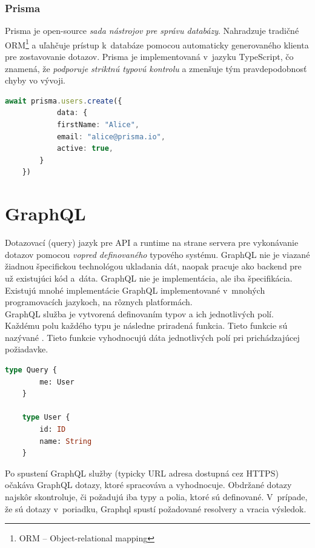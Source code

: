 \subsubsection{Prisma}
Prisma je open-source \emph{sada nástrojov pre správu databázy}. Nahradzuje tradičné ORM\footnote{ORM -- Object-relational mapping} a uľahčuje prístup k~databáze pomocou automaticky generovaného klienta pre zostavovanie dotazov. Prisma je implementovaná v~jazyku TypeScript, čo znamená, že \emph{podporuje striktnú typovú kontrolu} a zmenšuje tým pravdepodobnosť chyby vo vývoji. \cite{Prisma} \\

\begin{lstlisting}[language=TypeScript, caption=Príklad tvorby užívateľa pomocou nástroja Prisma. \cite{Prisma}]
	await prisma.users.create({
			data: {
			firstName: "Alice",
			email: "alice@prisma.io",
			active: true,
		}
	})
\end{lstlisting}

\section{GraphQL}
\label{section:graphql}
Dotazovací (query) jazyk pre API a runtime na strane servera pre vykonávanie dotazov pomocou \emph{vopred definovaného} typového systému. GraphQL nie je viazané žiadnou špecifickou technológou ukladania dát, naopak pracuje ako backend pre už existujúci kód a~dáta. \cite{GraphQL} GraphQL nie je implementácia, ale iba špecifikácia. Existujú mnohé implementácie GraphQL implementované v~mnohých programovacích jazykoch, na rôznych platformách. \\

\noindent GraphQL služba je vytvorená definovaním typov a ich jednotlivých polí. Každému polu každého typu je následne priradená funkcia. \cite{GraphQL} Tieto funkcie sú nazývané . Tieto funkcie vyhodnocujú dáta jednotlivých polí pri prichádzajúcej požiadavke. \\

\begin{lstlisting}[label=lstlisting:graphql_schema, language=GraphQL, caption=Príklad jednoduchej GraphQL schémy. \cite{GraphQL}]
	type Query {
		me: User
	}

	type User {
		id: ID
		name: String
	}
\end{lstlisting}

\bigskip

\noindent Po spustení GraphQL služby (typicky URL adresa dostupná cez HTTPS) očakáva GraphQL dotazy, ktoré spracováva a vyhodnocuje. Obdržané dotazy najskôr skontroluje, či požadujú iba typy a polia, ktoré sú definované. V~prípade, že sú dotazy v~poriadku, Graphql spustí požadované resolvery a vracia výsledok. \cite{GraphQL} \\

